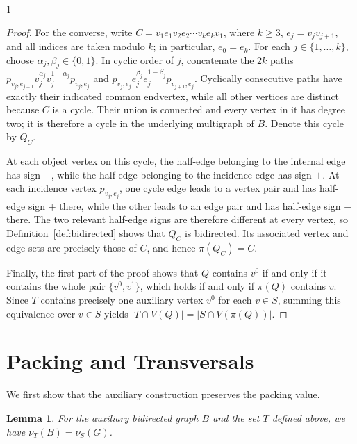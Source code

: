 \documentclass[a4paper,11pt]{article}
\theoremstyle{plain}
\newtheorem{lemma}[theorem]{Lemma}
\theoremstyle{definition}
\theoremstyle{remark}
\begin{document}
\begin{spacing}{1}
\begin{proof}
For the converse, write $C=v_1e_1v_2e_2\cdots v_ke_kv_1$, where $k\geq3$,
$e_j=v_jv_{j+1}$, and all indices are taken modulo $k$; in particular,
$e_0=e_k$.  For each $j\in\{1,\ldots,k\}$, choose
$\alpha_j,\beta_j\in\{0,1\}$.  In cyclic order of $j$, concatenate the $2k$
paths $p_{v_j,e_{j-1}}v_j^{\alpha_j}v_j^{1-\alpha_j}p_{v_j,e_j}$ and
$p_{v_j,e_j}e_j^{\beta_j}e_j^{1-\beta_j}p_{v_{j+1},e_j}$.  Cyclically
consecutive paths have exactly their indicated common endvertex, while all
other vertices are distinct because $C$ is a cycle.  Their union is connected
and every vertex in it has degree two; it is therefore a cycle in the
underlying multigraph of $B$.  Denote this cycle by $Q_C$.

At each object vertex on this cycle, the half-edge belonging to the internal
edge has sign $-$, while the half-edge belonging to the incidence edge has
sign $+$.  At each incidence vertex $p_{v_j,e_j}$, one cycle edge leads to a
vertex pair and has half-edge sign $+$ there, while the other leads to an edge
pair and has half-edge sign $-$ there.  The two relevant half-edge signs are
therefore different at every vertex, so Definition~\ref{def:bidirected} shows
that $Q_C$ is bidirected.  Its associated vertex and edge sets are precisely
those of $C$, and hence $\pi(Q_C)=C$.

Finally, the first part of the proof shows that $Q$ contains $v^0$ if and only
if it contains the whole pair $\{v^0,v^1\}$, which holds if and only if
$\pi(Q)$ contains $v$.  Since $T$ contains precisely one auxiliary vertex
$v^0$ for each $v\in S$, summing this equivalence over $v\in S$ yields
$|T\cap V(Q)|=|S\cap V(\pi(Q))|$.
\end{proof}

\section{Packing and Transversals}\label{sec:proof}

We first show that the auxiliary construction preserves the packing value.

\begin{lemma}\label{lem:packing}
For the auxiliary bidirected graph $B$ and the set $T$ defined above, we have
$\nu_T(B)=\nu_S(G)$.
\end{lemma}


\end{spacing}
\end{document}

